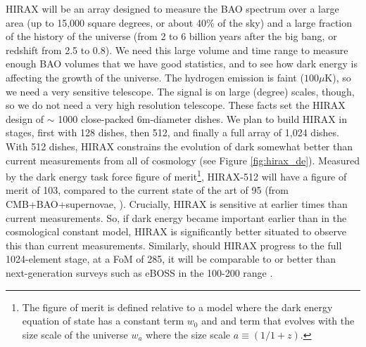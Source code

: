 \documentclass[letterpaper,11pt,preprint]{aastex}
\begin{document}
HIRAX will be an array designed to measure the BAO spectrum over a
large area (up to 15,000 square degrees, or about 40\% of the sky) and
a large fraction of the history of the universe (from 2 to 6 billion
years after the big bang, or redshift from 2.5 to 0.8).  We need this
large volume and time range to measure enough BAO volumes that we have
good statistics, and to see how dark energy is affecting the growth of
the universe.  The hydrogen emission is faint ($100 \mu \mathrm{K}$),
so we need a very sensitive telescope.  The signal is on large
(degree) scales, though, so we do not need a very high resolution
telescope.  These facts set the HIRAX design of $\sim$ 1000
close-packed 6m-diameter dishes.  We plan to build HIRAX in stages,
first with 128 dishes, then 512, and finally a full array of 1,024
dishes.  With 512 dishes, HIRAX constrains the evolution of dark
somewhat better than current measurements from all of cosmology (see
Figure \ref{fig:hirax_de}).  Measured by the dark energy task force
figure of merit\footnote{The figure of merit is defined relative to a
  model where the dark energy equation of state has a constant term
  $w_0$ and and term that evolves with the size scale of the universe
  $w_a$ where the size scale $a\equiv(1/1+z)$.}, HIRAX-512 will have a
figure of merit of 103, compared to the current state of the art of 95
(from CMB+BAO+supernovae, \citet{Planck2018Params}).  Crucially, HIRAX
is sensitive at earlier times than current measurements. So, if dark
energy became important earlier than in the cosmological constant
model, HIRAX is significantly better situated to observe this than
current measurements.  Similarly, should HIRAX progress to the full
1024-element stage, at a FoM of 285, it will be comparable to or better than
next-generation surveys such as eBOSS in the 100-200 range
\citep{Zhao2016}.


\end{document}
